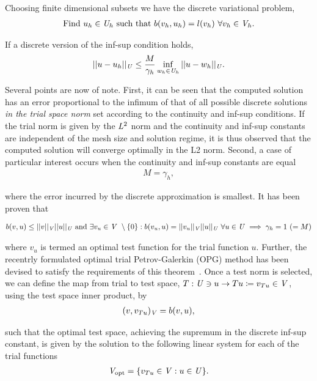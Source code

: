 \documentclass[]{article}
\begin{document}
Choosing finite dimensional subsets we have the discrete variational problem,
\begin{align} \label{eq:bilinear_abstract_finite}
\text{Find}\ u_h \in \mathit{{{U}}}_h\ \text{such that}\
b(v_h,u_h) = l(v_h)\ \forall v_h \in \mathit{{{V}}}_h.
\end{align}

If a discrete version of the inf-sup condition holds,
\begin{align} \label{eq:abstract_dpg_error}
||u-u_h||_{\mathit{{{U}}}} \le \frac{M}{\gamma_h} \inf_{w_h \in \mathit{{{U}}}_h} ||u-w_h||_{\mathit{{{U}}}}.
\end{align}

Several points are now of note. First, it can be seen that the computed solution
has an error proportional to the infimum of that of all possible discrete
solutions \emph{in the trial space norm} set according to the continuity and
inf-sup conditions. If the trial norm is given by the $\mathit{{{L}}}^2$ norm and
the continuity and inf-sup constants are independent of the mesh size and
solution regime, it is thus observed that the computed solution will converge
optimally in the L2 norm. Second, a case of particular interest occurs when the
continuity and inf-sup constants are equal
\begin{align} \label{eq:equal_m_gamma}
M = \gamma_h,
\end{align}

where the error incurred by the discrete approximation is smallest. It has been
proven that

\begin{align} \label{eq:bui_thanh_2-6}
  b(v,u) \le ||v||_{\mathit{{{V}}}} ||u||_{\mathit{{{U}}}}\ \text{and}\
 \exists v_u \in \mathit{{{V}}}\ \setminus \{0\} :
b(v_u,u) = ||v_u||_{\mathit{{{V}}}} ||u||_{\mathit{{{U}}}}\ \forall u \in \mathit{{{U}}}
\implies \gamma_h = 1\ (= M)
\end{align}

where $v_u$ is termed an optimal test function for the trial function $u$.
Further, the recentrly formulated optimal trial Petrov-Galerkin (OPG)
method has been devised to satisfy the requirements of
this theorem~\cite{Brunken2018}.
\iffalse
Once a test norm is selected, we can define the map from trial to test space,
$T: \mathit{{{U}}} \ni u \rightarrow Tu \coloneqq v_{Tu} \in \mathit{{{V}}} $,
using the test space inner product, by
\begin{align}
(v, v_{Tu})_{\mathit{{{V}}}} = b(v,u),
\end{align}

such that the optimal test space, achieving
the supremum in the discrete inf-sup constant, is given by the solution to the
following linear system for each of the trial functions
\begin{align} \label{eq:def_discrete_test_space_alt}
\mathit{{{V}}}_\text{opt} = \{ v_{T u} \in \mathit{{{V}}} : u \in \mathit{{{U}}} \}.
\end{align}
\end{document}
